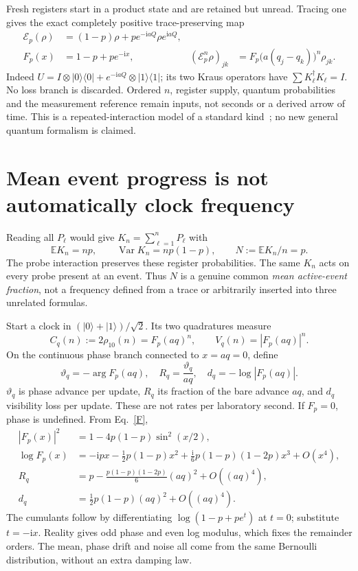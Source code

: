 \documentclass[11pt,a4paper]{article}
\newcommand{\ii}{\mathrm i}
\newcommand{\ket}[1]{|#1\rangle}
\newcommand{\bra}[1]{\langle#1|}
\newcommand{\Var}{\operatorname{Var}}
\begin{document}
Fresh registers start in a product state and are retained but unread.
Tracing one gives the exact completely positive trace-preserving map
\begin{align}
 \mathcal E_p(\rho)&=(1-p)\rho+p e^{-\ii aQ}\rho e^{\ii aQ},\label{channel}\\
 F_p(x)&=1-p+p e^{-\ii x},&
 (\mathcal E_p^n\rho)_{jk}&=F_p\big(a(q_j-q_k)\big)^n\rho_{jk}.\label{F}
\end{align}
Indeed $U=I\otimes\ket0\bra0+e^{-\ii aQ}\otimes\ket1\bra1$;
its two Kraus operators have $\sum K_\ell^\dagger K_\ell=I$.
No loss branch is discarded. Ordered $n$, register supply, quantum
probabilities and the measurement reference remain inputs, not seconds
or a derived arrow of time. This is a repeated-interaction model of a
standard kind~\cite{collision}; no new general quantum formalism is claimed.

\newpage
\section{Mean event progress is not automatically clock frequency}
Reading all $P_\ell$ would give $K_n=\sum_{\ell=1}^n P_\ell$ with
\begin{equation}
 \mathbb E K_n=np,\qquad \Var K_n=np(1-p),\qquad
 N:=\mathbb E K_n/n=p.\label{mean}
\end{equation}
The probe interaction preserves these register probabilities.
The same $K_n$ acts on every probe present at an event. Thus $N$ is a
genuine common \emph{mean active-event fraction}, not a frequency defined
from a trace or arbitrarily inserted into three unrelated formulas.

Start a clock in $(\ket0+\ket1)/\sqrt2$. Its two quadratures measure
\begin{equation}
 C_q(n):=2\rho_{10}(n)=F_p(aq)^n,
 \qquad V_q(n)=|F_p(aq)|^n.\label{clock}
\end{equation}
On the continuous phase branch connected to $x=aq=0$, define
\begin{equation}
 \vartheta_q=-\arg F_p(aq),\quad
 R_q=\frac{\vartheta_q}{aq},\quad
 d_q=-\log|F_p(aq)|.\label{rates}
\end{equation}
$\vartheta_q$ is phase advance per update, $R_q$ its fraction of the
bare advance $aq$, and $d_q$ visibility loss per update. These are not
rates per laboratory second. If $F_p=0$, phase is undefined. From
Eq.~\eqref{F},
\begin{align}
 |F_p(x)|^2&=1-4p(1-p)\sin^2(x/2),\label{modulus}\\
 \log F_p(x)&=-\ii px-\tfrac12p(1-p)x^2
 +\tfrac{\ii}{6}p(1-p)(1-2p)x^3+O(x^4),\\
 R_q&=p-\frac{p(1-p)(1-2p)}6(aq)^2+O((aq)^4),\label{rateexp}\\
 d_q&=\tfrac12p(1-p)(aq)^2+O((aq)^4).
\end{align}
The cumulants follow by differentiating $\log(1-p+pe^t)$ at $t=0$;
substitute $t=-\ii x$. Reality gives odd phase and even log modulus,
which fixes the remainder orders. The mean, phase drift and noise all
come from the same Bernoulli distribution, without an extra damping law.
\end{document}
